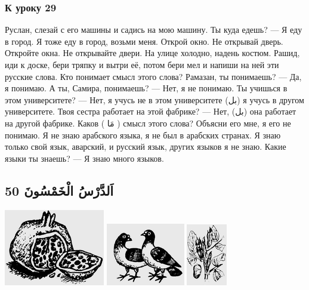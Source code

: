 \documentclass[a5paper]{article}
\begin{document}
\subsubsection{К уроку 29}
Руслан, слезай с его машины и садись на мою машину. Ты куда едешь? — Я еду в город. Я тоже еду в город, возьми меня. Открой окно. Не открывай дверь. Откройте окна. Не открывайте двери. На улице холодно, надень костюм. Рашид, иди к доске, бери тряпку и вытри её, потом бери мел и напиши на ней эти русские слова. Кто понимает смысл этого слова? Рамазан, ты понимаешь? — Да, я понимаю. А ты, Самира, понимаешь? — Нет, я не понимаю. Ты учишься в этом университете? — Нет, я учусь не в этом университете (بل) я учусь в другом университете. Твоя сестра работает на этой фабрике? — Нет, (بل) она работает на другой фабрике. Каков ( مَا ) смысл этого слова? Объясни его мне, я его не понимаю. Я не знаю арабского языка, я не был в арабских странах. Я знаю только свой язык, аварский, и русский язык, других языков я не знаю. Какие языки ты знаешь? — Я знаю много языков.

\subsection[اَلدَّرْسُ الْخَمْسُونَ 50 ]{اَلدَّرْسُ الْخَمْسُونَ 50 }
 \includegraphics[width=1.7291in,height=1.3126in]{MuhammadBagauddinlatinized-img163.png}   \includegraphics[width=1.3543in,height=1.0728in]{MuhammadBagauddinlatinized-img164.png}   \includegraphics[width=0.698in,height=1.0626in]{MuhammadBagauddinlatinized-img165.png} 
\end{document}
